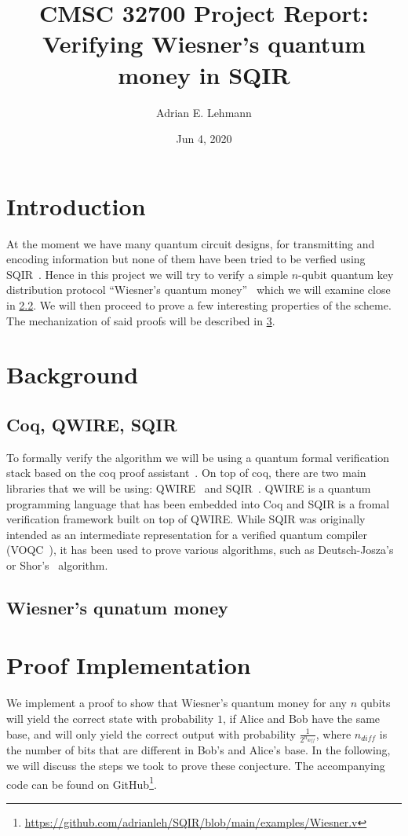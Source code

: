 \documentclass{article}
\title{CMSC 32700 Project Report: Verifying Wiesner's quantum money in SQIR}
\author{Adrian E. Lehmann}
\date{Jun 4, 2020}
\begin{document}
\maketitle

\section{Introduction}
At the moment we have many quantum circuit designs, for transmitting and encoding information but none of them have been tried to be verfied using SQIR~\cite{SQIR}. 
Hence in this project we will try to verify a simple $n$-qubit quantum key distribution protocol ``Wiesner's quantum money''~\cite{wiesner} which we will examine close in \cref{sec:wiesner}. 
We will then proceed to prove a few interesting properties of the scheme.
The mechanization of said proofs will be described in \cref{sec:proof-impl}.

\section{Background}

\subsection{Coq, QWIRE, SQIR}
To formally verify the algorithm we will be using a quantum formal verification stack based on the coq proof assistant~\cite{coq}.
On top of coq, there are two main libraries that we will be using: QWIRE~\cite{QWIRE} and SQIR~\cite{SQIR}.
QWIRE is a quantum programming language that has been embedded into Coq and SQIR is a fromal verification framework built on top of QWIRE.
While SQIR was originally intended as an intermediate representation for a verified quantum compiler (VOQC~\cite{voqc}), it has been used to prove various algorithms, such as Deutsch-Josza's~\cite{deutsch} or Shor's~\cite{shor} algorithm.


\subsection{Wiesner's qunatum money}\label{sec:wiesner}



\section{Proof Implementation}\label{sec:proof-impl}
We implement a proof to show that Wiesner's quantum money for any $n$ qubits will yield the correct state with probability $1$, if Alice and Bob have the same base, and will only yield the correct output with probability $\frac{1}{2^{n_{diff}}}$, where $n_{diff}$ is the number of bits that are different in Bob's and Alice's base. In the following, we will discuss the steps we took to prove these conjecture. The accompanying code can be found on GitHub\footnote{\url{https://github.com/adrianleh/SQIR/blob/main/examples/Wiesner.v}}.
\end{document}
